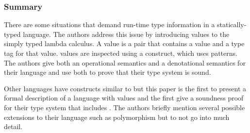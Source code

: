 \documentclass[12pt]{article}	%
\begin{document}
\subsubsection*{Summary}

There are some situations that demand run-time type information in a statically-typed language. The authors address this issue by introducing \Dynamic values to the simply typed lambda calculus. A \Dynamic value is a pair that contains a value and a type tag for that value. \Dynamic values are inspected using a \typecase construct, which uses patterns. The authors give both an operational semantics and a denotational semantics for their language and use both to prove that their type system is sound.

Other languages have constructs similar to \Dynamic but this paper is the first to present a formal description of a language with \Dynamic values and the first give a soundness proof for their type system that includes \Dynamic. The authors briefly mention several possible extensions to their language such as polymorphism but to not go into much detail.
\end{document}
